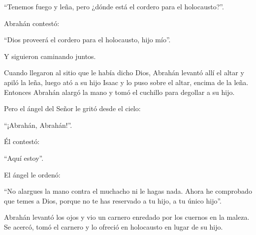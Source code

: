 			\begin{readtalk}“Tenemos fuego y leña, pero ¿dónde está el cordero para el holocausto?”. \end{readtalk}
			
			\begin{readbody}Abrahán contestó: \end{readbody}
			
			\begin{readtalk}“Dios proveerá el cordero para el holocausto, hijo mío”. \end{readtalk}
			
			\begin{readbody}Y siguieron caminando juntos. \end{readbody}
			
			\begin{readbody}Cuando llegaron al sitio que le había dicho Dios, Abrahán levantó allí el altar y apiló la leña, luego ató a su hijo Isaac y lo puso sobre el altar, encima de la leña. Entonces Abrahán alargó la mano y tomó el cuchillo para degollar a su hijo. \end{readbody}
			
			\begin{readbody}Pero el ángel del Señor le gritó desde el cielo: \end{readbody}
			
			\begin{readtalk}“¡Abrahán, Abrahán!”. \end{readtalk}
			
			\begin{readbody}Él contestó: \end{readbody}
			
			\begin{readtalk}“Aquí estoy”. \end{readtalk}
			
			\begin{readbody}El ángel le ordenó: \end{readbody}
			
			\begin{readtalk}“No alargues la mano contra el muchacho ni le hagas nada. Ahora he comprobado que temes a Dios, porque no te has reservado a tu hijo, a tu único hijo”. \end{readtalk}
			
			\begin{readbody}Abrahán levantó los ojos y vio un carnero enredado por los cuernos en la maleza. Se acercó, tomó el carnero y lo ofreció en holocausto en lugar de su hijo. \end{readbody}
			
